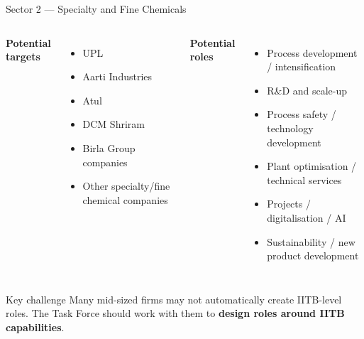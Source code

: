 \documentclass[aspectratio=169,11pt]{beamer}
\newcommand{\key}[1]{\textbf{\color{IITblue}#1}}
\begin{document}
\begin{frame}{Sector 2 — Specialty and Fine Chemicals}
\begin{columns}[T]
\textbf{Potential targets}
\begin{itemize}
\item UPL
\item Aarti Industries
\item Atul
\item DCM Shriram
\item Birla Group companies
\item Other specialty/fine chemical companies
\end{itemize}
\textbf{Potential roles}
\begin{itemize}
\item Process development / intensification
\item R\&D and scale-up
\item Process safety / technology development
\item Plant optimisation / technical services
\item Projects / digitalisation / AI
\item Sustainability / new product development
\end{itemize}
\end{columns}
\vspace{3mm}
\begin{alertblock}{Key challenge}
Many mid-sized firms may not automatically create IITB-level roles. The Task Force should work with them to \key{design roles around IITB capabilities}.
\end{alertblock}
\end{frame}
\end{document}
